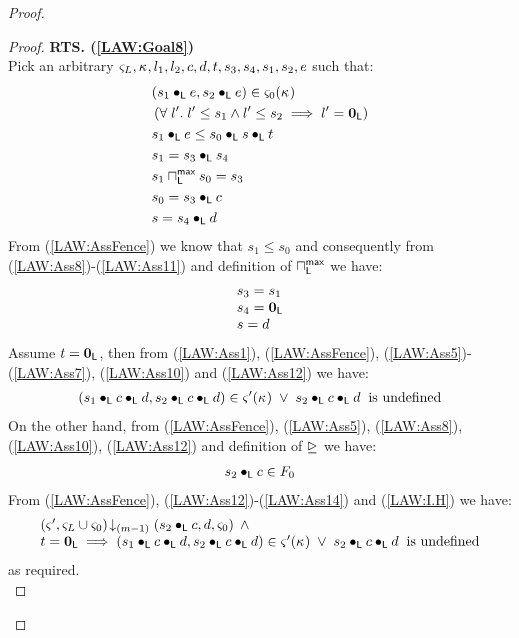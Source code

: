 \begin{lemma}[]
\begin{proof}
\begin{proof}
\noindent\textbf{RTS. (\ref{LAW:Goal8})} \\
Pick an arbitrary $\varsigma_{L}, \kappa_{}, l_1, l_2, c, d, t, s_3, s_4, s_1, s_2, e$ such that:
%
\begin{align}
	& (s_1 \bullet_{\textsf{L}} e, s_2 \bullet_{\textsf{L}} e) \in \varsigma_{0}(\kappa_{}) \label{LAW:Ass5} \\
	& \left(\forall\; l'.\; l' \leq s_1 \land l' \leq s_2 \implies l' = \mathbf{0}_{\textsf{L}}\right) \label{LAW:Ass6}\\
	& s_1 \bullet_{\textsf{L}} e \leq  s_0 \bullet_{\textsf{L}} s \bullet_{\textsf{L}} t\label{LAW:Ass7}\\
	& s_1 = s_3 \bullet_{\textsf{L}} s_4 \label{LAW:Ass8}\\
	& s_1 \sqcap_{\textsf{L}}^{\textsf{max}} s_0 = s_3 \label{LAW:Ass9}\\
	& s_0 = s_3 \bullet_{\textsf{L}} c \label{LAW:Ass10}\\
	& s= s_4 \bullet_{\textsf{L}} d \label{LAW:Ass11}
\end{align}
From (\ref{LAW:AssFence}) we know that $s_1 \leq s_0$ and consequently from (\ref{LAW:Ass8})-(\ref{LAW:Ass11}) and definition of $\sqcap_{\textsf{L}}^{\textsf{max}}$ we have:
%
\begin{align}
\begin{array}{l}
	s_3 = s_1 \\
	s_4 = \mathbf{0}_{\textsf{L}}\\
	s = d
\end{array} \label{LAW:Ass12}
\end{align}
Assume $t = \mathbf{0}_{\textsf{L}}$, then from (\ref{LAW:Ass1}), (\ref{LAW:AssFence}), (\ref{LAW:Ass5})-(\ref{LAW:Ass7}), (\ref{LAW:Ass10}) and (\ref{LAW:Ass12}) we have:
%
\begin{align}
	(s_1 \bullet_{\textsf{L}} c \bullet_{\textsf{L}} d, s_2 \bullet_{\textsf{L}} c \bullet_{\textsf{L}} d) \in \varsigma_{}'(\kappa_{}) \;\lor\; s_2 \bullet_{\textsf{L}} c \bullet_{\textsf{L}} d \hspace*{0.2cm} \text{is undefined} \label{LAW:Ass13}
\end{align}
%
On the other hand, from (\ref{LAW:AssFence}), (\ref{LAW:Ass5}), (\ref{LAW:Ass8}), (\ref{LAW:Ass10}), (\ref{LAW:Ass12}) and definition of $\unrhd$ we have:
%
\begin{align}
	s_2 \bullet_{\textsf{L}} c \in F_0 \label{LAW:Ass14}
\end{align}
%
From (\ref{LAW:AssFence}), (\ref{LAW:Ass12})-(\ref{LAW:Ass14}) and (\ref{LAW:I.H}) we have:
%
%
\begin{align}
\begin{array}{l}
	\left(\varsigma_{}', \varsigma_{L} \cup \varsigma_{0}\right) \!\downarrow_{(m-1)} \left(s_2 \bullet_{\textsf{L}} c, d, \varsigma_{0}\right) \;\land\\
	t = \mathbf{0}_{\textsf{L}} \implies (s_1 \bullet_{\textsf{L}} c \bullet_{\textsf{L}} d, s_2 \bullet_{\textsf{L}} c \bullet_{\textsf{L}} d) \in \varsigma_{}'(\kappa_{}) \;\lor\; s_2 \bullet_{\textsf{L}} c \bullet_{\textsf{L}} d \hspace*{0.2cm} \text{is undefined}
\end{array} \nonumber
\end{align}
as required.\\


\end{proof}
\end{proof}
\end{lemma}
